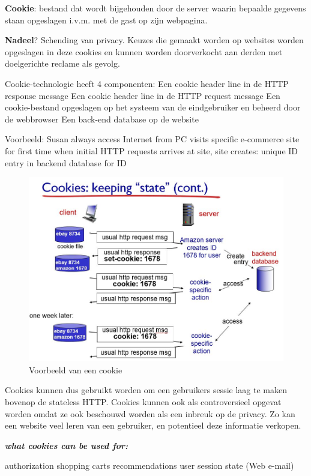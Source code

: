 \textbf{Cookie}: bestand dat wordt bijgehouden door de server waarin bepaalde gegevens staan opgeslagen i.v.m. met de gast op zijn webpagina.

\noindent \textbf{Nadeel}? Schending van privacy. Keuzes die gemaakt worden op websites worden opgeslagen in deze cookies en kunnen worden doorverkocht aan derden met doelgerichte reclame als gevolg.

\noindent Cookie-technologie heeft 4 componenten:
\be
\itf Een cookie header line in de HTTP response message
\itf Een cookie header line in de HTTP request message
\itf Een cookie-bestand opgeslagen op het systeem van de eindgebruiker en beheerd door de webbrowser
\itf Een back-end database op de website
\ee

\noindent Voorbeeld:
\be
\itf Susan always access Internet from PC
\itf visits specific e-commerce site for first time
\itf when initial HTTP requests arrives at site, site creates:
\itf unique ID
\itf entry in backend database for ID
\ee

\begin{figure}[h]
    \centering
    \includegraphics[width=4.5in]{./img/imghfdst2/cookie.jpg}
    \caption{Voorbeeld van een cookie }
    \label{fig:cookie}
\end{figure}

Cookies kunnen dus gebruikt worden om een gebruikers sessie laag te maken bovenop de stateless HTTP. Cookies kunnen ook als controversieel opgevat worden omdat ze ook beschouwd worden als een inbreuk op de privacy. Zo kan een website veel leren van een gebruiker, en potentieel deze informatie verkopen.

\noindent \textit{\textbf{what cookies can be used for:}}

\bi
\itf authorization
\itf shopping carts
\itf recommendations
\itf user session state (Web e-mail)
\ei

